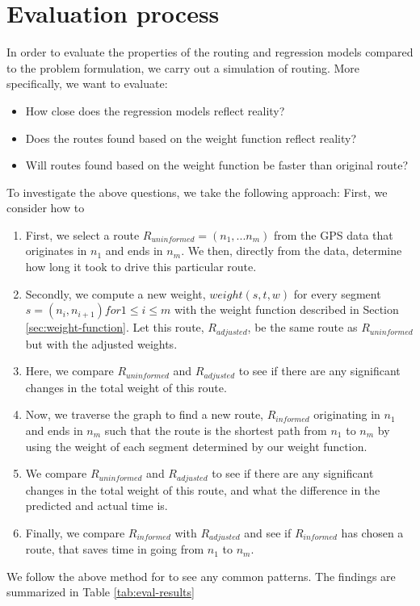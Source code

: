 \section{Evaluation process}
In order to evaluate the properties of the routing and regression models compared to the problem formulation, we carry out a simulation of routing. More specifically, we want to evaluate:
\begin{itemize}
\item How close does the regression models reflect reality?
\item Does the routes found based on the weight function reflect reality?
\item Will routes found based on the weight function be faster than original route?
\end{itemize}
To investigate the above questions, we take the following approach:
First, we consider how to
\begin{enumerate}
\item First, we select a route $R_{uninformed}=(n_1,...n_m)$ from the GPS data that originates in $n_1$ and ends in $n_m$. We then, directly from the data, determine how long it took to drive this particular route.
\item Secondly, we compute a new weight, $weight(s, t, w)$ for every segment $s=(n_i,n_{i+1}) for 1 \leq i \leq m$ with the weight function described in Section \ref{sec:weight-function}. Let this route, $R_{adjusted}$, be the same route as $R_{uninformed}$ but with the adjusted weights.
\item Here, we compare $R_{uninformed}$ and $R_{adjusted}$ to see if there are any significant changes in the total weight of this route.
\item Now, we traverse the graph to find a new route, $R_{informed}$ originating in $n_1$ and ends in $n_m$ such that the route is the shortest path from $n_1$ to $n_m$ by using the weight of each segment determined by our weight function.
\item We compare $R_{uninformed}$ and $R_{adjusted}$ to see if there are any significant changes in the total weight of this route, and what the difference in the predicted and actual time is.
\item Finally, we compare $R_{informed}$ with $R_{adjusted}$ and see if $R_{informed}$ has chosen a route, that saves time in going from $n_1$ to $n_m$.
\end{enumerate}
We follow the above method for  to see any common patterns. The findings are summarized in Table \ref{tab:eval-results}
